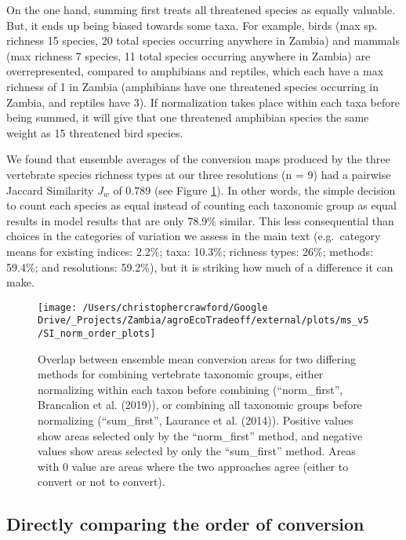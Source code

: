 \documentclass[
]{article}
\begin{document}
On the one hand, summing first treats all threatened species as equally valuable. But, it ends up being biased towards some taxa. For example, birds (max sp. richness 15 species, 20 total species occurring anywhere in Zambia) and mammals (max richness 7 species, 11 total species occurring anywhere in Zambia) are overrepresented, compared to amphibians and reptiles, which each have a max richness of 1 in Zambia (amphibians have one threatened species occurring in Zambia, and reptiles have 3). If normalization takes place within each taxa before being summed, it will give that one threatened amphibian species the same weight as 15 threatened bird species.

We found that ensemble averages of the conversion maps produced by the three vertebrate species richness types at our three resolutions (n = 9) had a pairwise Jaccard Similarity \(J_w\) of 0.789 (see Figure \ref{fig:norm-order}). In other words, the simple decision to count each species as equal instead of counting each taxonomic group as equal results in model results that are only 78.9\% similar. This less consequential than choices in the categories of variation we assess in the main text (e.g.~category means for existing indices: 2.2\%; taxa: 10.3\%; richness types: 26\%; methods: 59.4\%; and resolutions: 59.2\%), but it is striking how much of a difference it can make.



\begin{figure}

{\centering \texttt{[image: /Users/christophercrawford/Google Drive/\_Projects/Zambia/agroEcoTradeoff/external/plots/ms\_v5/SI\_norm\_order\_plots]} 

}

\caption{Overlap between ensemble mean conversion areas for two differing methods for combining vertebrate taxonomic groups, either normalizing within each taxon before combining (``norm\_first'', Brancalion et al. (2019)), or combining all taxonomic groups before normalizing (``sum\_first'', Laurance et al. (2014)). Positive values show areas selected only by the ``norm\_first'' method, and negative values show areas selected by only the ``sum\_first'' method. Areas with 0 value are areas where the two approaches agree (either to convert or not to convert).}\label{fig:norm-order}
\end{figure}

\newpage

\hypertarget{section-order}{%
\subsection{Directly comparing the order of conversion}\label{section-order}}
\end{document}
